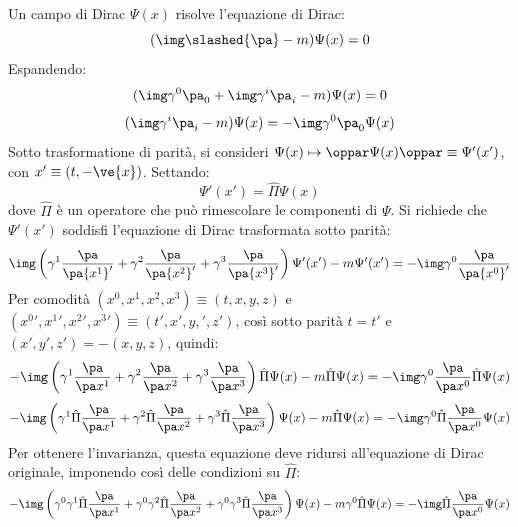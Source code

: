 Un campo di Dirac $ \Psi(x) $ risolve l'equazione di Dirac:
\begin{equation}
  (\img \slashed{\pa} - m) \Psi(x) = 0
\end{equation}
Espandendo:
\begin{equation*}
  (\img \gamma^0 \pa_0 + \img \gamma^i \pa_i - m) \Psi(x) = 0
\end{equation*}
\begin{equation*}
  (\img \gamma^i \pa_i - m) \Psi(x) = - \img \gamma^0 \pa_0 \Psi(x)
\end{equation*}
Sotto trasformatione di parità, si consideri $ \Psi(x) \mapsto \oppar \Psi(x) \oppar \equiv \Psi'(x') $, con $ x'  \equiv (t , -\ve{x}) $. Settando:
\begin{equation*}
  \Psi'(x') = \hat{\Pi} \Psi(x)
\end{equation*}
dove $ \hat{\Pi} $ è un operatore che può rimescolare le componenti di $ \Psi $. Si richiede che $ \Psi'(x') $ soddisfi l'equazione di Dirac trasformata sotto parità:
\begin{equation*}
  \img \left( \gamma^1 \frac{\pa}{\pa {x^1}'} + \gamma^2 \frac{\pa}{\pa {x^2}'} + \gamma^3 \frac{\pa}{\pa {x^3}'} \right) \Psi'(x') - m \Psi'(x') = - \img \gamma^0 \frac{\pa}{\pa {x^0}'}
\end{equation*}
Per comodità $ (x^0,x^1,x^2,x^3) \equiv (t,x,y,z) $ e $ ({x^0}' , {x^1}' , {x^2}' , {x^3}') \equiv (t',x',y,',z') $, così sotto parità $ t = t' $ e $ (x',y',z') = - (x,y,z) $, quindi:
\begin{equation*}
  - \img \left( \gamma^1 \frac{\pa}{\pa x^1} + \gamma^2 \frac{\pa}{\pa x^2} + \gamma^3 \frac{\pa}{\pa x^3} \right) \hat{\Pi} \Psi(x) - m \hat{\Pi} \Psi(x) = - \img \gamma^0 \frac{\pa}{\pa x^0} \hat{\Pi} \Psi(x)
\end{equation*}
\begin{equation*}
  - \img \left( \gamma^1 \hat{\Pi} \frac{\pa}{\pa x^1} + \gamma^2 \hat{\Pi} \frac{\pa}{\pa x^2} + \gamma^3 \hat{\Pi} \frac{\pa}{\pa x^3} \right) \Psi(x) - m \hat{\Pi} \Psi(x) = - \img \gamma^0 \hat{\Pi} \frac{\pa}{\pa x^0} \Psi(x)
\end{equation*}
Per ottenere l'invarianza, questa equazione deve ridursi all'equazione di Dirac originale, imponendo così delle condizioni su $ \hat{\Pi} $:
\begin{equation*}
  - \img \left( \gamma^0 \gamma^1 \hat{\Pi} \frac{\pa}{\pa x^1} + \gamma^0 \gamma^2 \hat{\Pi} \frac{\pa}{\pa x^2} + \gamma^0 \gamma^3 \hat{\Pi} \frac{\pa}{\pa x^3} \right) \Psi(x) - m \gamma^0 \hat{\Pi} \Psi(x) = - \img \hat{\Pi} \frac{\pa}{\pa x^0} \Psi(x)
\end{equation*}
